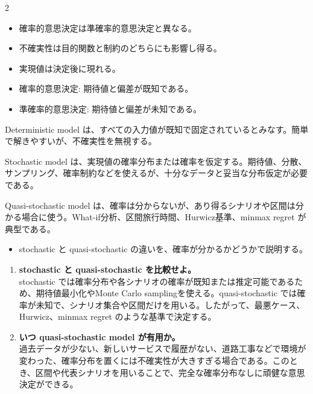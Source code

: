 \clearpage
{}
\begin{multicols}{2}\footnotesize\raggedcolumns
{}
\begin{itemize}
\item 確率的意思決定は準確率的意思決定と異なる。
\item 不確実性は目的関数と制約のどちらにも影響し得る。
\item 実現値は決定後に現れる。
\item 確率的意思決定: 期待値と偏差が既知である。
\item 準確率的意思決定: 期待値と偏差が未知である。
\end{itemize}
Deterministic model は、すべての入力値が既知で固定されているとみなす。簡単で解きやすいが、不確実性を無視する。\par

Stochastic model は、実現値の確率分布または確率を仮定する。期待値、分散、サンプリング、確率制約などを使えるが、十分なデータと妥当な分布仮定が必要である。\par

Quasi-stochastic model は、確率は分からないが、あり得るシナリオや区間は分かる場合に使う。What-if分析、区間旅行時間、Hurwicz基準、minmax regret が典型である。\par
{}
\begin{itemize}
\item stochastic と quasi-stochastic の違いを、確率が分かるかどうかで説明する。
\end{itemize}
\begin{enumerate}
\item \textbf{stochastic と quasi-stochastic を比較せよ。}\\stochastic では確率分布や各シナリオの確率が既知または推定可能であるため、期待値最小化やMonte Carlo samplingを使える。quasi-stochastic では確率が未知で、シナリオ集合や区間だけを用いる。したがって、最悪ケース、Hurwicz、minmax regret のような基準で決定する。
\item \textbf{いつ quasi-stochastic model が有用か。}\\過去データが少ない、新しいサービスで履歴がない、道路工事などで環境が変わった、確率分布を置くには不確実性が大きすぎる場合である。このとき、区間や代表シナリオを用いることで、完全な確率分布なしに頑健な意思決定ができる。
\end{enumerate}
\end{multicols}

